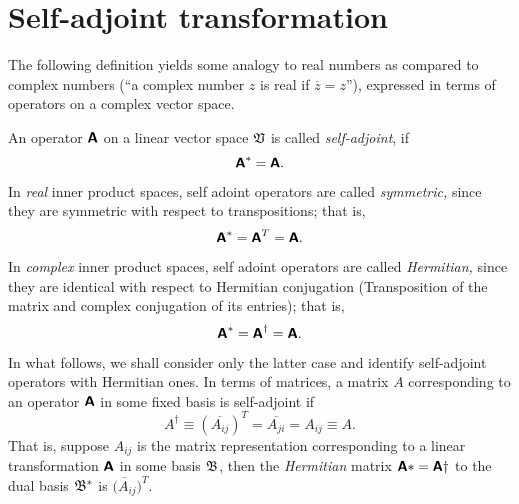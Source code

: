 \section{Self-adjoint transformation}



The following definition yields some analogy to real numbers as compared to complex numbers
(``a complex number $z$ is real if $\overline{z}=z$''),
expressed in terms of operators on a complex vector space.


An operator    $\textsf{\textbf{A}}$   on a linear vector space   ${\frak V}$
is called {\em self-adjoint}, if
\begin{equation}
\textsf{\textbf{A}}^{\ast}=
\textsf{\textbf{A}}.
\end{equation}

In {\em real} inner product spaces,
self adoint operators are called {\em symmetric,}
since they are symmetric with respect to transpositions; that is,
\begin{equation}
\textsf{\textbf{A}}^{\ast}= \textsf{\textbf{A}}^{T}=
\textsf{\textbf{A}}.
\end{equation}

In {\em complex} inner product spaces,
self adoint operators are called {\em Hermitian,}
since they are identical with respect to Hermitian conjugation (Transposition of the matrix and complex conjugation of its
entries); that is,
\begin{equation}
\textsf{\textbf{A}}^{\ast}= \textsf{\textbf{A}}^{\dagger}=
\textsf{\textbf{A}}.
\end{equation}

In what follows, we shall consider only the latter case and identify self-adjoint operators with Hermitian ones.
In terms of matrices, a matrix $A$ corresponding to an operator $\textsf{\textbf{A}}$ in
some fixed basis is self-adjoint
if
\begin{equation}
A^{\dagger}\equiv (\overline{A_{ij}})^T=  \overline{A_{ji}} =A_{ij} \equiv A.
\end{equation}
That is, suppose $A_{ij}$ is the matrix representation
corresponding to a linear transformation $\textsf{\textbf{A}}$  in some basis ${\frak B}$,
then the {\em Hermitian} matrix $\textsf{\textbf{A}}\ast = \textsf{\textbf{A}}\dagger$
to the dual basis
${\frak B}^*$
is
$\overline{(A_{ij}})^T$.



